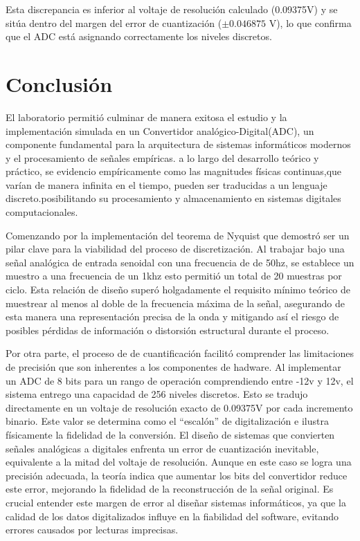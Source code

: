 \documentclass[12pt, a4paper]{article}
\begin{document}
    Esta discrepancia es inferior al voltaje de resolución calculado (0.09375V) y se sitúa dentro del margen del error de cuantización ($\pm 0.046875 \text{ V}$), lo que confirma que el ADC está asignando correctamente los niveles discretos.


    \newpage
    
    \section{Conclusión}

    El laboratorio permitió culminar de manera exitosa el estudio y la implementación simulada en un Convertidor analógico-Digital(ADC), un componente fundamental para la arquitectura de sistemas informáticos modernos y el procesamiento de señales empíricas. a lo largo del desarrollo teórico y práctico, se evidencio empíricamente como las magnitudes físicas continuas,que varían de manera infinita en el tiempo, pueden ser traducidas a un lenguaje discreto.posibilitando su procesamiento y almacenamiento en sistemas digitales computacionales.


    Comenzando por la implementación del teorema de Nyquist que demostró ser un pilar clave para la viabilidad del proceso de discretización. Al trabajar bajo una señal analógica de entrada senoidal con una frecuencia de de 50hz, se establece un muestro a una frecuencia de un 1khz esto permitió un total de 20 muestras por ciclo. Esta relación de diseño superó holgadamente el requisito mínimo teórico de muestrear al menos al doble de la frecuencia máxima de la señal, asegurando de esta manera una representación precisa de la onda y mitigando así el riesgo de posibles pérdidas de información o distorsión estructural durante el proceso.

    Por otra parte, el proceso de de cuantificación facilitó comprender las limitaciones de precisión que son inherentes a los componentes de hadware. Al implementar un ADC de 8 bits para un rango de operación comprendiendo entre -12v y 12v, el sistema entrego una capacidad de 256 niveles discretos. Esto se tradujo directamente en un voltaje de resolución exacto de 0.09375V por cada incremento binario. Este valor se determina como el “escalón” de digitalización e ilustra físicamente la fidelidad de la conversión. El diseño de sistemas que convierten señales analógicas a digitales enfrenta un error de cuantización inevitable, equivalente a la mitad del voltaje de resolución. Aunque en este caso se logra una precisión adecuada, la teoría indica que aumentar los bits del convertidor reduce este error, mejorando la fidelidad de la reconstrucción de la señal original. Es crucial entender este margen de error al diseñar sistemas informáticos, ya que la calidad de los datos digitalizados influye en la fiabilidad del software, evitando errores causados por lecturas imprecisas.
\end{document}
